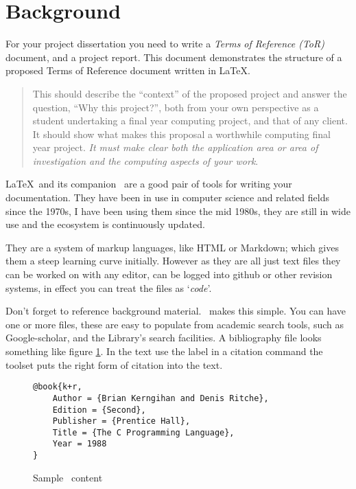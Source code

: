 
\section{Background}
For your project dissertation you need to write a \emph{Terms of Reference
(ToR)} document, and a project report.
This document demonstrates the structure of a proposed Terms of Reference document written in \LaTeX.

\begin{quotation}
This should describe the ``context'' of the proposed project and answer the
question, ``Why this project?'', both from your own perspective as a student
undertaking a final year computing project, and that of any client.  It should
show what makes this proposal a worthwhile computing final year project.
\emph{It must make clear both the application area or area of investigation
and the computing aspects of your work}.
\end{quotation}

\LaTeX\ and its companion \BibTeX\ are a good pair of tools for writing your
documentation.  They have been in use in computer science and related fields
since the 1970s, I have been using them since the mid 1980s, they are still in
wide use and the ecosystem is continuously updated.

They are a system of markup languages, like HTML or Markdown; which gives
them a steep learning curve initially.  However as they are all just text
files they can be worked on with any editor, can be logged into github or
other revision systems, in effect you can treat the files as `\emph{code}'.

Don't forget to reference background material.  \BibTeX\ makes this simple.
You can have one or more  files, these are  easy to populate from
academic search tools, such as Google-scholar, and the Library's search
facilities.  A bibliography file looks something like figure
\ref{bibtex-sample}.  In the text use the label in a citation command
\texttt{\citep[pages 2--4]{k+r}} the toolset puts the right form of citation
	\citep[pages 2--4]{k+r} into the text.


\begin{figure}
\begin{tcolorbox}
\begin{verbatim}
@book{k+r,
	Author = {Brian Kerngihan and Denis Ritche},
	Edition = {Second},
	Publisher = {Prentice Hall},
	Title = {The C Programming Language},
	Year = 1988
}
\end{verbatim}
\end{tcolorbox}
\caption{Sample \BibTeX\ content}
\label{bibtex-sample}
\end{figure}

